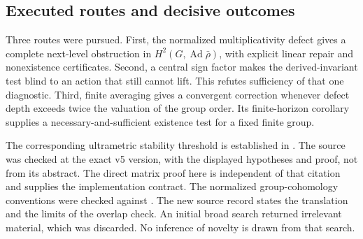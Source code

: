 \documentclass[11pt]{article}
\theoremstyle{definition}
\theoremstyle{remark}
\begin{document}
\subsection{Executed routes and decisive outcomes}
Three routes were pursued. First, the normalized multiplicativity defect gives a complete next-level obstruction in $H^2(G,\operatorname{Ad}\bar\rho)$, with explicit linear repair and nonexistence certificates. Second, a central sign factor makes the derived-invariant test blind to an action that still cannot lift. This refutes sufficiency of that one diagnostic. Third, finite averaging gives a convergent correction whenever defect depth exceeds twice the valuation of the group order. Its finite-horizon corollary supplies a necessary-and-sufficient existence test for a fixed finite group.

The corresponding ultrametric stability threshold is established in \cite[Lemma 7.3]{FournierFacio2026}. The source was checked at the exact v5 version, with the displayed hypotheses and proof, not from its abstract. The direct matrix proof here is independent of that citation and supplies the implementation contract. The normalized group-cohomology conventions were checked against \cite[Chapter II, 1.17--1.19]{MilneCFT2020}. The new source record states the translation and the limits of the overlap check. An initial broad search returned irrelevant material, which was discarded. No inference of novelty is drawn from that search.
\end{document}
